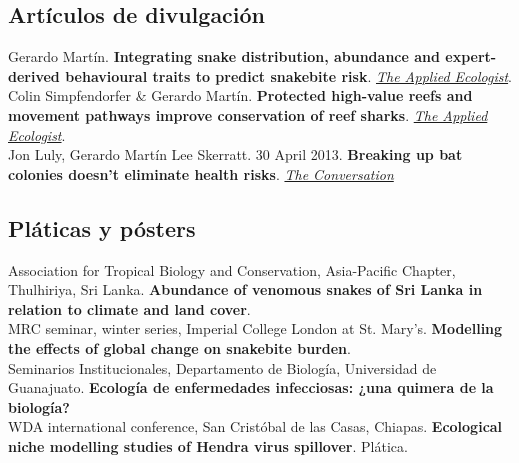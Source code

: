 \documentclass[11pt, letter]{article}
\newcommand{\years}[1]{\marginnote{\scriptsize #1}}
\begin{document}
\subsection*{Art\'iculos de divulgaci\'on}

\years{2021} Gerardo Mart\'in. \textbf{Integrating snake distribution, abundance and expert-derived behavioural traits to predict snakebite risk}. \href{https://appliedecologistsblog.com/2021/12/27/integrating-snake-distribution-abundance-and-expert-derived-behavioural-traits-to-predict-snakebite-risk/}{\emph{The Applied Ecologist}}.\\

\years{2020} Colin Simpfendorfer \& Gerardo Mart\'in. \textbf{Protected high-value reefs and movement pathways improve conservation of reef sharks}. \href{https://appliedecologistsblog.com/2020/07/30/protected-high-value-reefs-and-movement-pathways-improve-conservation-of-reef-sharks/}{\emph{The Applied Ecologist}}.\\

\years{2013} Jon Luly, Gerardo Mart\'in Lee Skerratt. 30 April 2013. \textbf{Breaking up bat colonies doesn't eliminate health risks}. \href{http://theconversation.com/breaking-up-bat-colonies-doesnt-eliminate-health-risks-13580}{\emph{The Conversation}}


\subsection*{Pl\'aticas y p\'osters}

\years{2019} Association for Tropical Biology and Conservation, Asia-Pacific Chapter, Thulhiriya, Sri Lanka. \textbf{Abundance of venomous snakes of Sri Lanka in relation to climate and land cover}.\\

\years{2019} MRC seminar, winter series, Imperial College London at St. Mary's. \textbf{Modelling the effects of global change on snakebite burden}.\\

\years{2017} Seminarios Institucionales, Departamento de Biolog\'ia, Universidad de Guanajuato. \textbf{Ecolog\'ia de enfermedades infecciosas: ¿una quimera de la biolog\'ia?}\\

\years{2017} WDA international conference, San Crist\'obal de las Casas, Chiapas. \textbf{Ecological niche modelling studies of Hendra virus spillover}. Pl\'atica.\\
\end{document}
